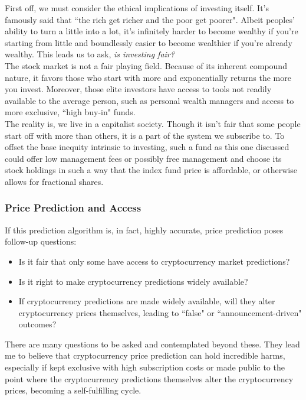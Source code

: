 \documentclass{article}
\begin{document}
First off, we must consider the ethical implications of investing itself. It's famously said that ``the rich get richer and the poor get poorer". Albeit peoples' ability to turn a little into a lot, it's infinitely harder to become wealthy if you're starting from little and boundlessly easier to become wealthier if you're already wealthy. This leads us to ask, \textit{is investing fair?} \\

The stock market is not a fair playing field. Because of its inherent compound nature, it favors those who start with more and exponentially returns the more you invest. Moreover, those elite investors have access to tools not readily available to the average person, such as personal wealth managers and access to more exclusive, ``high buy-in" funds. \\

The reality is, we live in a capitalist society. Though it isn't fair that some people start off with more than others, it is a part of the system we subscribe to. To offset the base inequity intrinsic to investing, such a fund as this one discussed could offer low management fees or possibly free management and choose its stock holdings in such a way that the index fund price is affordable, or otherwise allows for fractional shares.

\subsubsection{Price Prediction and Access}
\label{sec:access}

If this prediction algorithm is, in fact, highly accurate, price prediction poses follow-up questions:

\begin{itemize}

    \item Is it fair that only some have access to cryptocurrency market predictions?
    \item Is it right to make cryptocurrency predictions widely available?
    \item If cryptocurrency predictions are made widely available, will they alter cryptocurrency prices themselves, leading to ``false" or ``announcement-driven" outcomes?

\end{itemize}

There are many questions to be asked and contemplated beyond these. They lead me to believe that cryptocurrency price prediction can hold incredible harms, especially if kept exclusive with high subscription costs or made public to the point where the cryptocurrency predictions themselves alter the cryptocurrency prices, becoming a self-fulfilling cycle. \\
\end{document}
